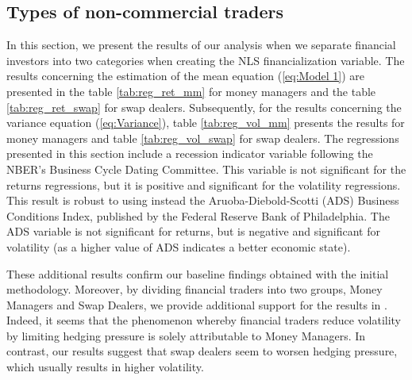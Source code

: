 \documentclass[12pt]{article}
\begin{document}
\subsection{Types of non-commercial traders}

 In this section, we present the results of our analysis when we separate financial investors into two categories when creating the NLS financialization variable. The results concerning the estimation of the mean equation (\ref{eq:Model 1}) are presented in the table \ref{tab:reg_ret_mm} for money managers and the table \ref{tab:reg_ret_swap} for swap dealers.  Subsequently, for the results concerning the variance equation (\ref{eq:Variance}), table \ref{tab:reg_vol_mm} presents the results for money managers and table \ref{tab:reg_vol_swap} for swap dealers.
The regressions presented in this section include a recession indicator variable following the NBER's Business Cycle Dating Committee. This variable is not significant for the returns regressions, but it is positive and significant for the volatility regressions. This result is robust to using instead the Aruoba-Diebold-Scotti (ADS) Business Conditions Index, published by the Federal Reserve Bank of Philadelphia. The ADS variable is not significant for returns, but is negative and significant for volatility (as a higher value of ADS indicates a better economic state).

 
These additional results confirm our baseline findings obtained with the initial methodology. Moreover, by dividing financial traders into two groups, Money Managers and Swap Dealers, we provide additional support for the results in \citet{brunetti2016speculators}. Indeed, it seems that the phenomenon whereby financial traders reduce volatility by limiting hedging pressure is solely attributable to Money Managers. In contrast, our results suggest that swap dealers seem to worsen hedging pressure, which usually results in higher volatility.

 
\end{document}
